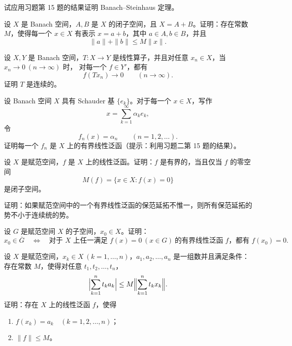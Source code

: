 \begin{homework}[3.9]
试应用习题第 15 题的结果证明 Banach--Steinhaus 定理。
\end{homework}

\begin{homework}[3.10]
设 $X$ 是 Banach 空间，$A,B$ 是 $X$ 的闭子空间，且 $X=A+B$。证明：存在常数 $M$，使得每一个
$x\in X$ 有表示 $x=a+b$，其中 $a\in A,b\in B$，并且
\[
\|a\|+\|b\|\le M\|x\|.
\]
\end{homework}

\begin{homework}[3.11]
设 $X,Y$ 是 Banach 空间，$T:X\to Y$ 是线性算子，并且对任意 $x_n\in X$，当 $x_n\to 0\ (n\to\infty)$ 时，
对每一个 $f\in Y'$，都有
\[
f(Tx_n)\longrightarrow 0\qquad(n\to\infty).
\]
证明 $T$ 是连续的。
\end{homework}
\begin{homework}[3.12]
设 Banach 空间 $X$ 具有 Schauder 基 $\{e_k\}$。对于每一个 $x\in X$，写作
\[
x=\sum_{k=1}^{\infty}\alpha_k e_k,
\]
令
\[
f_n(x)=\alpha_n\qquad (n=1,2,\dots).
\]
证明每一个 $f_n$ 是 $X$ 上的有界线性泛函（提示：利用习题二第 15 题的结果）。
\end{homework}

\begin{homework}[3.13]
设 $X$ 是赋范空间，$f$ 是 $X$ 上的线性泛函。证明：$f$ 是有界的，当且仅当 $f$ 的零空间
\[
M(f)=\{x\in X: f(x)=0\}
\]
是闭子空间。
\end{homework}

\begin{homework}[3.14]
证明：如果赋范空间中的一个有界线性泛函的保范延拓不惟一，则所有保范延拓的势不小于连续统的势。
\end{homework}

\begin{homework}[3.15]
设 $G$ 是赋范空间 $X$ 的子空间，$x_0\in X$。证明：
\[
x_0\in\overline{G}
\quad\Longleftrightarrow\quad
\text{对于 $X$ 上任一满足 } f(x)=0\ (x\in G)\ \text{的有界线性泛函 $f$，都有 } f(x_0)=0.
\]
\end{homework}
\begin{homework}[3.16]
设 $X$ 是赋范空间，$x_k\in X\ (k=1,\dots,n)$，$a_1,a_2,\dots,a_n$ 是一组数并且满足条件：存在常数 $M$，使得对任意
$t_1,t_2,\dots,t_n$，
\[
\Bigl|\sum_{k=1}^n t_k a_k\Bigr|
   \le M\Bigl\|\sum_{k=1}^n t_k x_k\Bigr\|.
\]
证明：存在 $X$ 上的线性泛函 $f$，使得  
\begin{enumerate}
  \item $f(x_k)=a_k\quad (k=1,2,\dots,n)$；
  \item $\|f\|\le M$。
\end{enumerate}
\end{homework}

